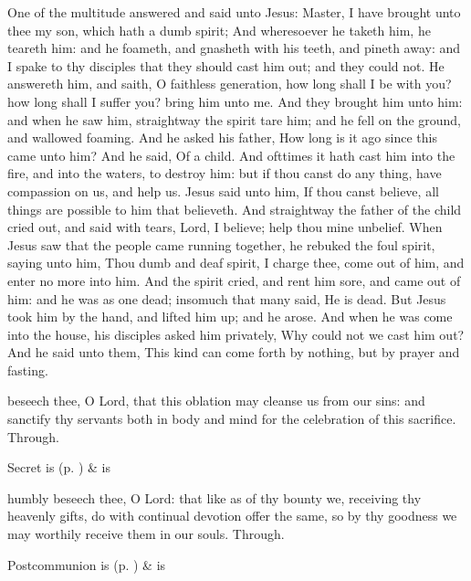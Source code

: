  One of the multitude answered and said unto Jesus: Master, I have brought unto thee my son, which hath a dumb spirit; And wheresoever he taketh him, he teareth him: and he foameth, and gnasheth with his teeth, and pineth away: and I spake to thy disciples that they should cast him out; and they could not. He answereth him, and saith, O faithless generation, how long shall I be with you? how long shall I suffer you? bring him unto me. And they brought him unto him: and when he saw him, straightway the spirit tare him; and he fell on the ground, and wallowed foaming. And he asked his father, How long is it ago since this came unto him? And he said, Of a child. And ofttimes it hath cast him into the fire, and into the waters, to destroy him: but if thou canst do any thing, have compassion on us, and help us. Jesus said unto him, If thou canst believe, all things are possible to him that believeth. And straightway the father of the child cried out, and said with tears, Lord, I believe; help thou mine unbelief. When Jesus saw that the people came running together, he rebuked the foul spirit, saying unto him, Thou dumb and deaf spirit, I charge thee, come out of him, and enter no more into him. And the spirit cried, and rent him sore, and came out of him: and he was as one dead; insomuch that many said, He is dead. But Jesus took him by the hand, and lifted him up; and he arose. And when he was come into the house, his disciples asked him privately, Why could not we cast him out? And he said unto them, This kind can come forth by nothing, but by prayer and fasting.


\secret
{} beseech thee, O Lord, that this oblation may cleanse us from our sins: and sanctify thy servants both in body and mind for the celebration of this sacrifice. Through.
\begin{rubric}
     Secret is  (p. \pageref{SPSaints}) \&  is 
\end{rubric}


\postcommunion
{} humbly beseech thee, O Lord: that like as of thy bounty we, receiving thy heavenly gifts, do with continual devotion offer the same, so by thy goodness we may worthily receive them in our souls. Through.
\begin{rubric}
     Postcommunion is  (p. \pageref{SPSaints}) \&  is 
\end{rubric}

